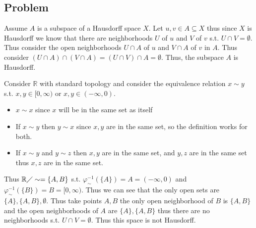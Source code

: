 \documentclass[12pt, letterpaper]{article}
\newcounter{problem}
\newcommand{\q}{
    \newpage %
    \stepcounter{problem} %
    \subsection*{Problem \arabic{problem}} %
}
\newcommand{\R}{\mathbb{R}}
\begin{document}
\q
Assume $A$ is a subspace of a Hausdorff space $X$. Let $u,v \in A \subseteq X$ thus since $X$ is Hausdorff we know that there are neighborhoods $U$ of $u$ and $V$ of $v$ s.t. $U \cap V = \emptyset$. Thus consider the open neighborhoods $U \cap A$ of $u$ and $V \cap A$ of $v$ in $A$. Thus consider $(U \cap A) \cap (V \cap A)=(U \cap V) \cap A=\emptyset$. Thus, the subspace $A$ is Hausdorff.

Consider $\R$ with standard topology and consider the equivalence relation $x \sim y$ s.t. $x,y \in [0,\infty)$ or $x,y \in (-\infty,0)$.
\begin{itemize}
    \item $x \sim x$ since $x$ will be in the same set as itself
    \item If $x \sim y$ then $y \sim x$ since $x,y$ are in the same set, so the definition works for both.
    \item If $x \sim y$ and $y \sim z$ then $x,y$ are in the same set, and $y,z$ are in the same set thus $x,z$ are in the same set.
\end{itemize}
Thus $\R \diagup \sim = \{A,B\}$ s.t. $\varphi_\sim^{-1}(\{A\})=A=(-\infty,0)$ and $\varphi_\sim^{-1}(\{B\})=B=[0,\infty)$. Thus we can see that the only open sets are $\{A\},\{A,B\},\emptyset$. Thus take points $A,B$ the only open neighborhood of $B$ is $\{A,B\}$ and the open neighborhoods of $A$ are $\{A\},\{A,B\}$ thus there are no neighborhoods s.t. $U \cap V= \emptyset$. Thus this space is not Hausdorff.
\end{document}
